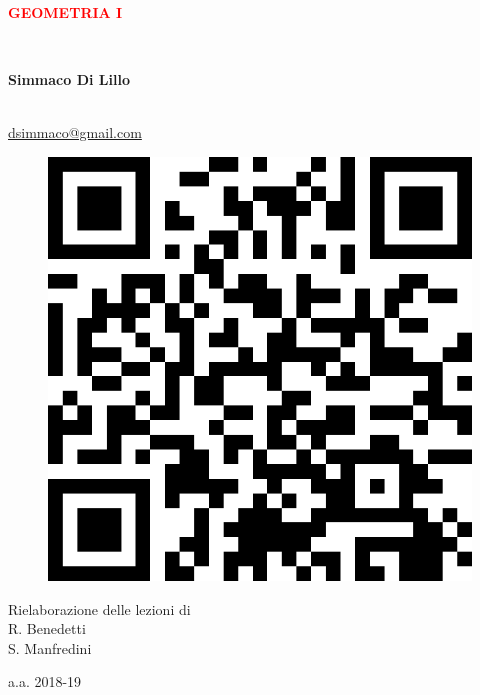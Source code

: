 \begin{center}
\begin{Huge}
      \vspace*{3 cm}
    \textcolor{red}{\textbf{GEOMETRIA I}}
   \end{Huge}\\ \spazio 
   \begin{Large}   \textbf{Simmaco Di Lillo}
   \end{Large}\\
   \href{mailto:dsimmaco@.com ?subject=Geometria I }{dsimmaco@gmail.com} \\
   \vspace{0.5 cm }
    \begin{figure}[!h]
    \centering
    \includegraphics[scale=0.25]{qr-code}
    \end{figure}
   \vspace{5.5cm }
   Rielaborazione delle lezioni di 
   \\
   R. Benedetti \\
   S. Manfredini 
  
   \spazio
   a.a. 2018-19
   \end{center}
  
   \newpage

   \tableofcontents 

\newpage
  
  \newpage 
 \newpage
  \newpage
\newpage
\newpage
\newpage

